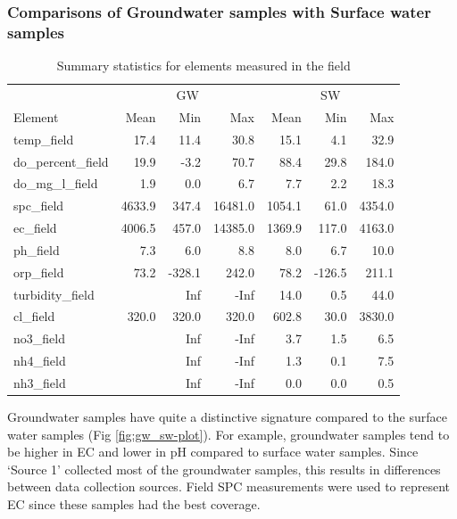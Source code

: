 \documentclass[, manuscript]{copernicus}
\begin{document}
\subsubsection{Comparisons of Groundwater samples with Surface water
samples}

\clearpage

\begin{table}
\centering
\caption{\label{tab:TableElementstats}Summary statistics for elements measured in the field}
\centering
\begin{tabular}[t]{l|r|r|r|r|r|r}
\hline
\multicolumn{1}{c|}{} & \multicolumn{3}{c|}{GW} & \multicolumn{3}{c}{SW} \\
\cline{2-4} \cline{5-7}
Element & Mean & Min & Max & Mean & Min & Max\\
\hline
temp\_field & 17.4 & 11.4 & 30.8 & 15.1 & 4.1 & 32.9\\
\hline
do\_percent\_field & 19.9 & -3.2 & 70.7 & 88.4 & 29.8 & 184.0\\
\hline
do\_mg\_l\_field & 1.9 & 0.0 & 6.7 & 7.7 & 2.2 & 18.3\\
\hline
spc\_field & 4633.9 & 347.4 & 16481.0 & 1054.1 & 61.0 & 4354.0\\
\hline
ec\_field & 4006.5 & 457.0 & 14385.0 & 1369.9 & 117.0 & 4163.0\\
\hline
ph\_field & 7.3 & 6.0 & 8.8 & 8.0 & 6.7 & 10.0\\
\hline
orp\_field & 73.2 & -328.1 & 242.0 & 78.2 & -126.5 & 211.1\\
\hline
turbidity\_field &  & Inf & -Inf & 14.0 & 0.5 & 44.0\\
\hline
cl\_field & 320.0 & 320.0 & 320.0 & 602.8 & 30.0 & 3830.0\\
\hline
no3\_field &  & Inf & -Inf & 3.7 & 1.5 & 6.5\\
\hline
nh4\_field &  & Inf & -Inf & 1.3 & 0.1 & 7.5\\
\hline
nh3\_field &  & Inf & -Inf & 0.0 & 0.0 & 0.5\\
\hline
\end{tabular}
\end{table}

Groundwater samples have quite a distinctive signature compared to the
surface water samples (Fig \ref{fig:gw_sw-plot}). For example,
groundwater samples tend to be higher in EC and lower in pH compared to
surface water samples. Since `Source 1' collected most of the
groundwater samples, this results in differences between data collection
sources. Field SPC measurements were used to represent EC since these
samples had the best coverage.
\end{document}
